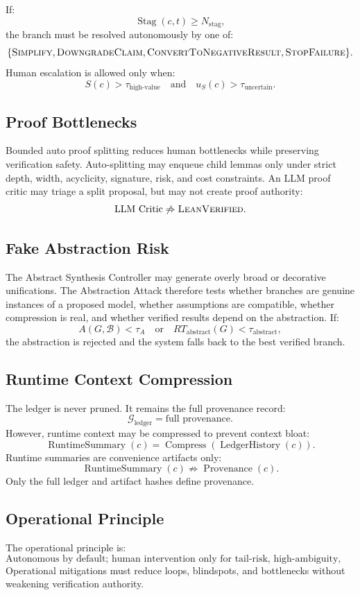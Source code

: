 \documentclass[11pt]{article}
\begin{document}
If:
$$
\operatorname{Stag}(c,t)\geq N_{\text{stag}},
$$
the branch must be resolved autonomously by one of:
$$
\{\textsc{Simplify},\textsc{DowngradeClaim},\textsc{ConvertToNegativeResult},\textsc{StopFailure}\}.
$$
Human escalation is allowed only when:
$$
S(c)>\tau_{\text{high-value}}
\quad\text{and}\quad
u_S(c)>\tau_{\text{uncertain}}.
$$

\subsection{Proof Bottlenecks}
Bounded auto proof splitting reduces human bottlenecks while preserving verification safety. Auto-splitting may enqueue child lemmas only under strict depth, width, acyclicity, signature, risk, and cost constraints. An LLM proof critic may triage a split proposal, but may not create proof authority:
$$
\text{LLM Critic}\not\Rightarrow\textsc{LeanVerified}.
$$

\subsection{Fake Abstraction Risk}
The Abstract Synthesis Controller may generate overly broad or decorative unifications. The Abstraction Attack therefore tests whether branches are genuine instances of a proposed model, whether assumptions are compatible, whether compression is real, and whether verified results depend on the abstraction. If:
$$
A(G,\mathcal{B})<\tau_A
\quad\text{or}\quad
RT_{\text{abstract}}(G)<\tau_{\text{abstract}},
$$
the abstraction is rejected and the system falls back to the best verified branch.

\subsection{Runtime Context Compression}
The ledger is never pruned. It remains the full provenance record:
$$
\mathcal{G}_{\text{ledger}}=\text{full provenance}.
$$
However, runtime context may be compressed to prevent context bloat:
$$
\operatorname{RuntimeSummary}(c)
=
\operatorname{Compress}(\operatorname{LedgerHistory}(c)).
$$
Runtime summaries are convenience artifacts only:
$$
\operatorname{RuntimeSummary}(c)\not\Rightarrow\operatorname{Provenance}(c).
$$
Only the full ledger and artifact hashes define provenance.

\subsection{Operational Principle}
The operational principle is:
$$
\boxed{\text{Autonomous by default; human intervention only for tail-risk, high-ambiguity, high-cost, or irreversible decisions.}}
$$
Operational mitigations must reduce loops, blindspots, and bottlenecks without weakening verification authority.
\end{document}
